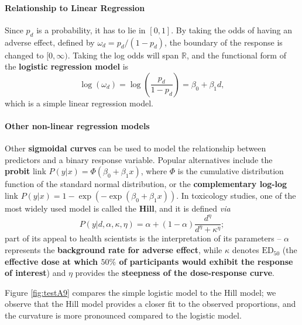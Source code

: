\paragraph{Relationship to Linear Regression}
Since $p_{d}$ is a probability, it has to lie in $[0,1]$. By taking the odds of having an adverse effect, defined by $\omega_{d}=p_{d}/(1-p_{d})$, the boundary of the response is changed to $[0,\infty)$. Taking the log odds will span $\mathbb{R}$, and the functional form of the \textbf{logistic regression model} is 
\begin{equation} \label{eq:logit}
    \log(\omega_{d})=\log\left(\frac{p_{d}}{1-p_{d}}\right)=\beta_{0}+\beta_{1}d,
\end{equation}
which is a simple linear regression model.

\paragraph{Other non-linear regression models}
Other \textbf{sigmoidal curves} can be used to model the relationship between predictors and a binary response variable. Popular alternatives include the \textbf{probit} link $P(y|x)=\Phi(\beta_{0}+\beta_{1}x)$, where $\Phi$ is the cumulative distribution function of the standard normal distribution, or the \textbf{complementary log-log} link $P(y|x)=1-\exp(-\exp(\beta_{0}+\beta_{1}x))$. In toxicology studies, one of the most widely used model is called the \textbf{Hill}, and it is defined \textit{via} 
\begin{equation*}
    P(y|d,\alpha, \kappa, \eta)=\alpha + (1-\alpha)\frac{d^{\eta}}{d^{\eta}+\kappa^{\eta}};
\end{equation*}
part of its appeal to health scientists is the interpretation of its parameters -- $\alpha$ represents the \textbf{background rate for adverse effect}, while $\kappa$ denotes $\textrm{ED}_{50}$ (the \textbf{effective dose at which $50\%$ of participants would exhibit the response of interest}) and $\eta$ provides the \textbf{steepness of the dose-response curve}. \par Figure \ref{fig:testA9} compares the simple logistic model to the Hill model; we observe that the Hill model provides a closer fit to the observed proportions, and the curvature is more pronounced compared to the logistic model.

